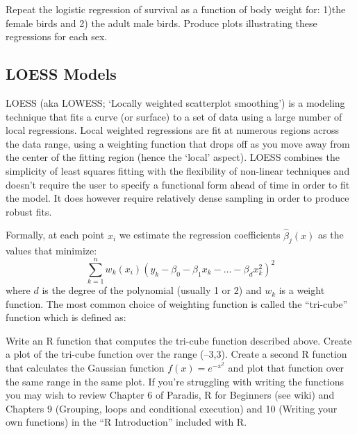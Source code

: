 \medskip
\begin{assignment}
Repeat the logistic regression of survival as a
function of body weight for: 1)the female birds and 2) the adult male
birds. Produce plots illustrating these regressions for each sex.
\end{assignment}

\subsection{LOESS Models}

LOESS (aka LOWESS; `Locally weighted scatterplot smoothing') is a
modeling technique that fits a curve (or surface) to a set of data using
a large number of local regressions. Local weighted regressions are fit
at numerous regions across the data range, using a weighting function
that drops off as you move away from the center of the fitting region
(hence the `local' aspect). LOESS combines the simplicity of least
squares fitting with the flexibility of non-linear techniques and
doesn't require the user to specify a functional form ahead of time in
order to fit the model. It does however require relatively dense
sampling in order to produce robust fits.

Formally, at each point $x_i$ we estimate the regression coefficients
$\hat{\beta}_j(x)$ as the values that minimize:
\[\sum_{k=1}^n w_k(x_i)(y_k - \beta_0 - \beta_1 x_k - \ldots - \beta_d x_k^2)^2\]
where $d$ is the degree of the polynomial (usually 1 or 2) and $w_k$ is
a weight function. The most common choice of weighting function is
called the ``tri-cube'' function which is defined as:



\medskip
\begin{assignment}
Write an R function that computes the tri-cube
function described above. Create a plot of the tri-cube function over
the range (--3,3). Create a second R function that calculates the
Gaussian function $f(x) = e^{-x^2}$ and plot that function over the same
range in the same plot. If you're struggling with writing the functions
you may wish to review Chapter 6 of Paradis, R for Beginners (see wiki)
and Chapters 9 (Grouping, loops and conditional execution) and 10
(Writing your own functions) in the ``R Introduction'' included with R.
\end{assignment}

